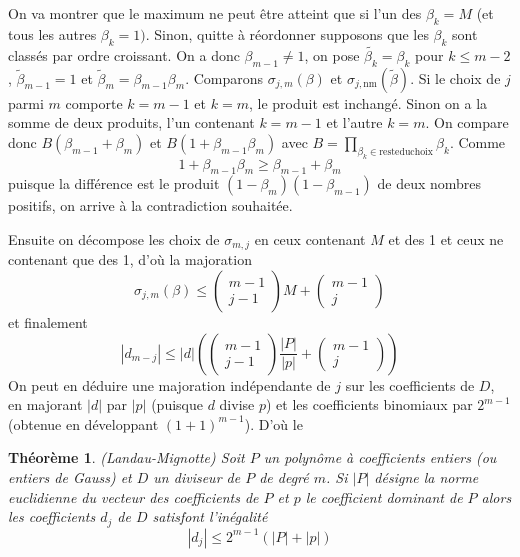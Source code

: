 \documentclass[a4paper,11pt]{article}
\newtheorem{thm}{Théorème}
\begin{document}
On va montrer que le maximum ne peut être atteint que si l'un des $\beta_k =
M$ (et tous les autres $\beta_k = 1 )$. Sinon, quitte à réordonner supposons
que les $\beta_k$ sont classés par ordre croissant. On a donc $\beta_{m - 1}
\neq 1$, on pose $\widetilde{\beta_k} = \beta_k$ pour $k \leqslant m - 2$,
$\tilde{\beta}_{m - 1} = 1$ et $\tilde{\beta}_m = \beta_{m - 1} \beta_m$.
Comparons $\sigma_{j, m} ( \beta )$ et $\sigma_{j, \mbox{nm}} ( \tilde{\beta}
)$. Si le choix de $j$ parmi $m$ comporte $k = m - 1$ et $k = m$, le produit
est inchangé. Sinon on a la somme de deux produits, l'un contenant $k = m - 1$
et l'autre $k = m$. On compare donc $B ( \beta_{m - 1} + \beta_m )$ et $B ( 1
+ \beta_{m - 1} \beta_m )$ avec $B = \prod_{\beta_k \in \mbox{reste} \mbox{du}
\mbox{choix}} \beta_k$. Comme
\[ \text{$1 + \beta_{m - 1} \beta_m \geqslant \beta_{m - 1} + \beta_m$} \]
puisque la différence est le produit $(1-\beta_m)(1-\beta_{m-1})$ de deux
nombres positifs, on arrive à la contradiction souhaitée.

Ensuite on décompose les choix de $\sigma_{m, j}$ en ceux contenant $M$ et
des 1 et ceux ne contenant que des 1, d'où la majoration
\[ \sigma_{j, m} ( \beta ) \leqslant \left(\begin{array}{c}
     m - 1\\
     j - 1
   \end{array}\right) M + \left(\begin{array}{c}
     m - 1\\
     j
   \end{array}\right)  \]
et finalement
\begin{equation}
  | d_{m - j} | \leqslant | d | \left( \left(\begin{array}{c}
    m - 1\\
    j - 1
  \end{array}\right)  \frac{| P |}{| p |} + \left(\begin{array}{c}
    m - 1\\
    j
  \end{array}\right) \right) \label{pgcdd}
\end{equation}
On peut en déduire une majoration indépendante de $j$ sur les coefficients de
$D$, en majorant $| d |$ par $| p |$ (puisque $d$ divise $p$) et les
coefficients binomiaux par $2^{m - 1}$ (obtenue en développant $( 1 + 1 )^{m -
1}$). D'où le

\begin{thm} 
  (Landau-Mignotte) Soit $P$ un polynôme à coefficients entiers (ou entiers de
  Gauss) et $D$ un diviseur de $P$ de degré $m$. Si $| P |$ désigne la norme
  euclidienne du vecteur des coefficients de $P$ et $p$ le coefficient
  dominant de $P$ alors les coefficients $d_j$ de $D$ satisfont l'inégalité
  \begin{equation}
    | d_j | \leqslant 2^{m - 1} ( | P | + | p | )
  \end{equation}
\end{thm}
\end{document}
